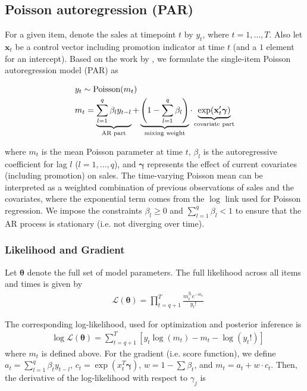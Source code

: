\documentclass{article}
\begin{document}
\subsection{Poisson autoregression (PAR)}

\noindent For a given item, denote the sales at timepoint $t$ by $y_{t}$, where $t=1,\ldots,T$. Also let $\mathbf{x}_t$ be a control vector including promotion indicator at time $t$ (and a $1$ element for an intercept). Based on the work by \cite{brandt2001linear}, we formulate the single-item Poisson autoregression model (PAR) as

\begin{align}
    & y_{t} \sim \text{Poisson}(m_{t}) \label{eq:PAR} \\
    & m_t = \underbrace{\sum_{l=1}^{q} \beta_l y_{t-l}}_{\text{AR part}} +
\underbrace{\left(1 - \sum_{l=1}^{q} \beta_l \right)}_{\text{mixing weight}} \cdot
\underbrace{\exp( \mathbf{x}_t'\boldsymbol{\gamma})}_{\text{covariate part}} \notag
\end{align}

\noindent where $m_t$ is the mean Poisson parameter at time $t$, $\beta_l$ is the autoregressive coefficient for lag $l$ ($l=1,\ldots,q$), and $\boldsymbol{\gamma}$ represents the effect of current covariates (including promotion) on sales. The time-varying Poisson mean can be interpreted as a weighted combination of previous observations of sales and the covariates, where the exponential term comes from the $\log$ link used for Poisson regression. We impose the constraints $\beta_l \geq 0$ and $\sum_{l=1}^q \beta_l < 1$ to ensure that the AR process is stationary (i.e. not diverging over time).

\subsubsection{Likelihood and Gradient}

\noindent Let $\boldsymbol{\theta}$ denote the full set of model parameters. The full likelihood across all items and times is given by
\begin{align*}
    & \mathcal{L}(\boldsymbol{\theta}) =
\prod_{t=q+1}^T
\frac{m_{t}^{y_{t}} e^{-m_{t}}}{y_{t}!}
\end{align*}

\noindent The corresponding log-likelihood, used for optimization and posterior inference is
\begin{align*}
    & \log \mathcal{L}(\boldsymbol{\theta}) =
\sum_{t=q+1}^T \left[
y_{t} \log(m_{t}) - m_{t} - \log(y_{t}!)
\right]
\end{align*}
\noindent where $m_t$ is defined above. For the gradient (i.e. score function), we define $a_t = \sum_{l=1}^q \beta_ty_{t-l}$, $c_t = \exp(x_t^T\boldsymbol{\gamma})$,  $w = 1 - \sum\beta_t$, and $m_t = a_t + w \cdot c_t$. Then, the derivative of the log-likelihood with respect to $\gamma_j$ is
\end{document}
